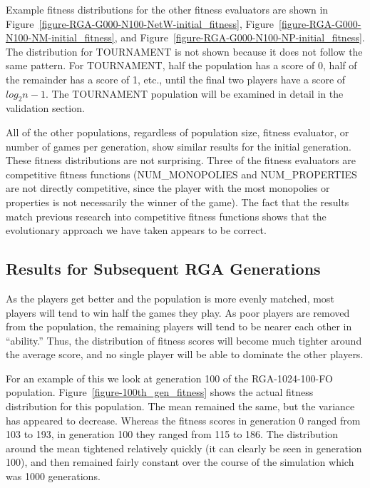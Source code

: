 Example fitness distributions for the other fitness evaluators are shown in
Figure~\ref{figure-RGA-G000-N100-NetW-initial_fitness},
Figure~\ref{figure-RGA-G000-N100-NM-initial_fitness}, and
Figure~\ref{figure-RGA-G000-N100-NP-initial_fitness}. The distribution for
TOURNAMENT is not shown because it does not follow the same pattern. For
TOURNAMENT, half the population has a score of 0, half of the remainder has a
score of 1, etc., until the final two players have a score of \(log_{2} n-1\).
The TOURNAMENT population will be examined in detail in the validation section.

All of the other populations, regardless of population size, fitness evaluator,
or number of games per generation, show similar results for the initial
generation. These fitness distributions are not surprising. Three of the fitness
evaluators are competitive fitness functions (NUM\_MONOPOLIES and
NUM\_PROPERTIES are not directly competitive, since the player with the most
monopolies or properties is not necessarily the winner of the game). The fact
that the results match previous research into competitive fitness functions
shows that the evolutionary approach we have taken appears to be correct.

\subsection{Results for Subsequent RGA Generations}

As the players get better and the population is more evenly matched, most
players will tend to win half the games they play. As poor players are removed
from the population, the remaining players will tend to be nearer each other in
``ability.'' Thus, the distribution of fitness scores will become much tighter
around the average score, and no single player will be able to dominate the
other players.

For an example of this we look at generation 100 of the RGA-1024-100-FO
population. Figure~\ref{figure-100th_gen_fitness} shows the actual fitness
distribution for this population. The mean remained the same, but the variance
has appeared to decrease. Whereas the fitness scores in generation 0 ranged from
103 to 193, in generation 100 they ranged from 115 to 186. The distribution
around the mean tightened relatively quickly (it can clearly be seen in
generation 100), and then remained fairly constant over the course of the
simulation which was 1000 generations.

